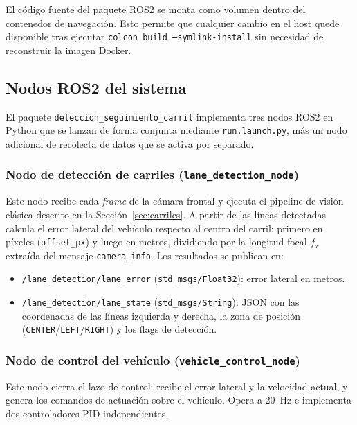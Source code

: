 \documentclass[12pt, a4paper]{article}
\begin{document}
El código fuente del paquete ROS2 se monta como volumen dentro del contenedor de navegación. Esto permite que cualquier cambio en el host quede disponible tras ejecutar \texttt{colcon build --symlink-install} sin necesidad de reconstruir la imagen Docker.

\subsection{Nodos ROS2 del sistema}

El paquete \texttt{deteccion\_seguimiento\_carril} implementa tres nodos ROS2 en Python que se lanzan de forma conjunta mediante \texttt{run.launch.py}, más un nodo adicional de recolecta de datos que se activa por separado.

\subsubsection{Nodo de detección de carriles (\texttt{lane\_detection\_node})}

Este nodo recibe cada \textit{frame} de la cámara frontal y ejecuta el pipeline de visión clásica descrito en la Sección~\ref{sec:carriles}. A partir de las líneas detectadas calcula el error lateral del vehículo respecto al centro del carril: primero en píxeles (\texttt{offset\_px}) y luego en metros, dividiendo por la longitud focal $f_x$ extraída del mensaje \texttt{camera\_info}. Los resultados se publican en:
\begin{itemize}
    \item \texttt{/lane\_detection/lane\_error} (\texttt{std\_msgs/Float32}): error lateral en metros.
    \item \texttt{/lane\_detection/lane\_state} (\texttt{std\_msgs/String}): JSON con las coordenadas de las líneas izquierda y derecha, la zona de posición (\texttt{CENTER}/\texttt{LEFT}/\texttt{RIGHT}) y los flags de detección.
\end{itemize}

\subsubsection{Nodo de control del vehículo (\texttt{vehicle\_control\_node})}

Este nodo cierra el lazo de control: recibe el error lateral y la velocidad actual, y genera los comandos de actuación sobre el vehículo. Opera a 20~Hz e implementa dos controladores PID independientes.
\end{document}
